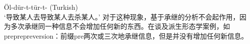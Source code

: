 \begin{exe}
\begin{xlist}[iv.]
\begin{exe}
\begin{xlist}[iv.]
\ea
Öl-dür-t-tür-t- \hfill(Turkish)\\
`导致某人去导致某人去杀某人。' 
\z 
对于这种现象，基于承继的分析不会起作用，因为多次承继同一种信息不会增加任何新的东西。\citet{KN93a}在谈及派生形态学案例，如preprepreversion：前缀pre两次或三次地承继信息，但是并没有增加任何新信息。


\end{xlist}
\end{exe}
\end{xlist}
\end{exe}
